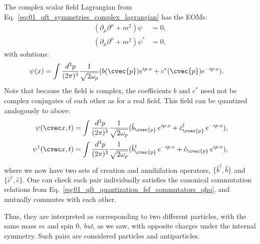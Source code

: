 The complex scalar field Lagrangian from Eq.~\ref{eq:01_qft_symmetries_complex_lagrangian} has the EOMs:
\begin{equation}
    \label{eq:01_qft_quantization_complex_eoms}
    \begin{split}
        (\partial_\mu\partial^\mu + m^2)\psi &= 0, \\
        (\partial_\mu\partial^\mu + m^2)\psi^* &= 0,
    \end{split}
\end{equation}
with solutions:
\begin{equation}
    \label{eq:01_qft_quantization_complex_solutions}
    \begin{split}
        \psi(x) &= \int \frac{d^3p}{(2\pi)^3} \frac{1}{\sqrt{2\omega_p}} (b(\cvec{p})e^{ip\cdot x} + c^*(\cvec{p}) e^{-ip\cdot x}).
    \end{split}
\end{equation}
Note that because the field is complex, the coefficients $b$ and $c^*$ need not be complex conjugates of each other as for a real field.
This field can be quantized analogously to above:
\begin{equation}
    \label{eq:01_qft_quantization_complex_fields}
    \begin{split}
        \psi(\cvec x, t) &= \int \frac{d^3p}{(2\pi)^3} \frac{1}{\sqrt{2\omega_p}} (\hat b_{\cvec{p}}\,e^{ip\cdot x} + \hat c^\dagger_{\cvec{p}}\, e^{-ip\cdot x}), \\
        \psi^\dagger(\cvec x, t) &= \int \frac{d^3p}{(2\pi)^3} \frac{1}{\sqrt{2\omega_p}} (\hat b^\dagger_{\cvec{p}}\,e^{-ip\cdot x} + \hat c_{\cvec{p}}\, e^{ip\cdot x}),
    \end{split}
\end{equation}
where we now have two sets of creation and annihilation operators, $\{\hat b^\dagger, \hat b\}$ and $\{\hat c^\dagger, \hat c\}$.
One can check each pair individually satisfies the canonical commutation relations from Eq.~\ref{eq:01_qft_quantization_fsf_commutators_qho}, and mutually commutes with each other.

Thus, they are interpreted as corresponding to two different particles, with the same mass $m$ and spin 0, \textit{but}, as we saw, with opposite charges under the \UU[1] internal symmetry.
Such pairs are considered particles and antiparticles.

